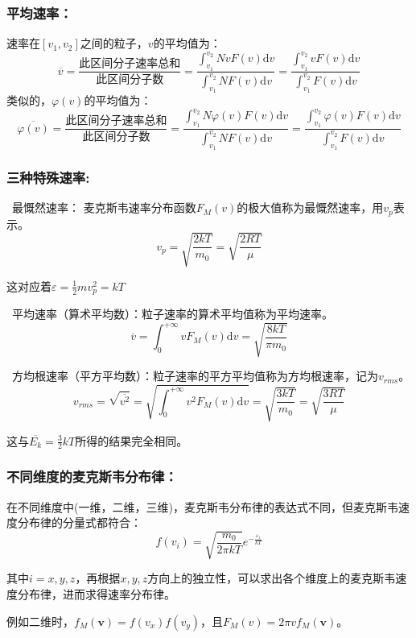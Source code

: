 \documentclass[zihao=-4,UTF8]{report}
\begin{document}
\subsubsection{平均速率：}
速率在$[v_1,v_2]$之间的粒子，$v$的平均值为：
\begin{equation}
    \overline{v} = \frac{\text{此区间分子速率总和}}{\text{此区间分子数}} = \frac{\int_{v_1}^{v_2}NvF(v)\mathrm{d}v }{\int_{v_1}^{v_2}NF(v)\mathrm{d}v} = \frac{\int_{v_1}^{v_2}vF(v)\mathrm{d}v }{\int_{v_1}^{v_2}F(v)\mathrm{d}v}
\end{equation}
类似的，$\varphi(v)$的平均值为：
\begin{equation}
    \overline{\varphi(v)} = \frac{\text{此区间分子速率总和}}{\text{此区间分子数}} = \frac{\int_{v_1}^{v_2}N\varphi(v)F(v)\mathrm{d}v }{\int_{v_1}^{v_2}NF(v)\mathrm{d}v} = \frac{\int_{v_1}^{v_2}\varphi(v)F(v)\mathrm{d}v }{\int_{v_1}^{v_2}F(v)\mathrm{d}v}
\end{equation}
\subsubsection{三种特殊速率:}
\ 最慨然速率：
麦克斯韦速率分布函数$F_M(v)$的极大值称为最慨然速率，用$v_p$表示。
\begin{equation}
    v_p = \sqrt{\frac{2kT}{m_0}} = \sqrt{\frac{2RT}{\mu }}
\end{equation}\par
{\color{gray}\small 这对应着$\varepsilon = \frac{1}{2}mv_p^2 = kT$}\par
{}\ 平均速率（算术平均数）：粒子速率的算术平均值称为平均速率。
\begin{equation}
    \overline{v} = \int_{0}^{+\infty} vF_M(v)\mathrm{d}v = \sqrt{\frac{8kT}{\pi m_0}}
\end{equation}\par
{}\ 方均根速率（平方平均数）：粒子速率的平方平均值称为方均根速率，记为$v_{rms}$。
\begin{equation}
    v_{rms} = \sqrt{\overline{v^2}} =  \sqrt{\int_{0}^{+\infty} v^2F_M(v)\mathrm{d}v} = \sqrt{ \frac{3kT}{m_0}} = \sqrt{ \frac{3RT}{\mu }}
\end{equation}\par    
{\color{gray}\small 这与$\overline{E_k} = \frac{3}{2}kT$所得的结果完全相同。}
\subsubsection{不同维度的麦克斯韦分布律：}
在不同维度中(一维，二维，三维)，麦克斯韦分布律的表达式不同，但麦克斯韦速度分布律的分量式都符合：
\begin{equation}
    f(v_i) = \sqrt{\frac{m_0}{2\pi kT}}e^{-\frac{\varepsilon_{i}}{kT}}
\end{equation}\par
其中$i = x,y,z$，再根据$x,y,z$方向上的独立性，可以求出各个维度上的麦克斯韦速度分布律，进而求得速率分布律。\par
{\color{gray}\small 例如二维时，$f_M(\boldsymbol{v}) = f(v_x)f(v_y)$，且$F_M(v) = 2\pi vf_M(\boldsymbol{v})$。} 
\end{document}
